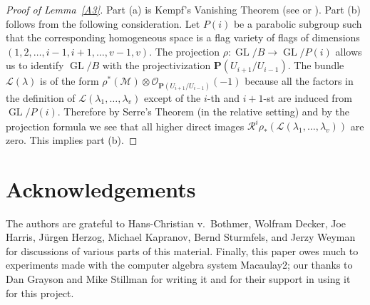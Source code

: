 \documentclass{jams-l}
\theoremstyle{definition}
\theoremstyle{remark}
\newcommand{\PP}{{\mathbf P}}
\newcommand{\GL}{{\operatorname{GL}}}
\newcommand{\cal}{\mathcal}
\begin{document}
\begin{proof}[Proof of Lemma~\ref{A3}] 
Part (a) is Kempf's Vanishing
Theorem  (see \cite{Kempf 1976} or \cite{Haboush 1980}). 
Part (b) follows from the following
consideration. Let $P(i)$ be a parabolic subgroup such that the
corresponding homogeneous space is a flag variety of
flags of dimensions $(1,2,\ldots ,i-1,i+1,\ldots ,v-1,v)$. The projection
$\rho :{\GL}/{ B}\rightarrow {\GL}/P(i)$
allows us to identify ${\GL}/{B}$ with the projectivization 
$\PP({U}_{i+1}/{U}_{i-1})$. The bundle 
${\cal L}(\lambda )$ is of the form 
$\rho^* ({\cal M})\otimes {\cal O}_{\PP({U}_{i+1}/{U}_{i-1})}(-1)$
because all the factors in the definition of ${\cal L}(\lambda_1 ,\ldots
,\lambda_v )$ except of the $i$-th and $i+1$-st are
induced from ${\GL}/P(i)$. Therefore by Serre's Theorem (in the
relative setting) and by the projection formula we see that
all higher direct images ${\cal R}^i\rho_* ({\cal L}(\lambda_1 ,\ldots
,\lambda_v ))$ are zero. This implies part (b).
\end{proof}

\section*{Acknowledgements}
The authors are grateful to
Hans-Christian v.~Bothmer,
Wolfram Decker,\linebreak
Joe Harris,
J\"urgen Herzog,
Michael Kapranov,
Bernd Sturmfels,
and Jerzy \linebreak Weyman
for discussions of various parts of this  material. Finally,
this paper owes \linebreak much to experiments made with the computer
algebra system Macaulay2\linebreak \cite{Grayson and Stillman 1993-- }; our
thanks to Dan Grayson and Mike Stillman
for writing it and for their support in using it for this project.
\end{document}
